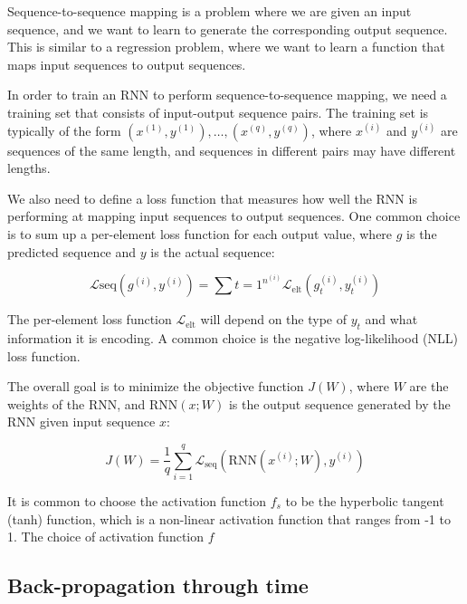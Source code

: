     Sequence-to-sequence mapping is a problem where we are given an input sequence, and we want to learn to generate the corresponding output sequence. This is similar to a regression problem, where we want to learn a function that maps input sequences to output sequences.
    
    In order to train an RNN to perform sequence-to-sequence mapping, we need a training set that consists of input-output sequence pairs. The training set is typically of the form ${(x^{(1)}, y^{(1)}), \dots, (x^{(q)}, y^{(q)})}$, where $x^{(i)}$ and $y^{(i)}$ are sequences of the same length, and sequences in different pairs may have different lengths.
    
    We also need to define a loss function that measures how well the RNN is performing at mapping input sequences to output sequences. One common choice is to sum up a per-element loss function for each output value, where $g$ is the predicted sequence and $y$ is the actual sequence:
    
    \begin{equation}
    \mathcal{L}{\text{seq}}\left(g^{(i)}, y^{(i)}\right) = \sum{t = 1}^{n^{(i)}}\mathcal{L}_\text{elt}\left(g_t^{(i)}, y_t^{(i)}\right)
    \end{equation}
    
    The per-element loss function $\mathcal{L}_\text{elt}$ will depend on the type of $y_t$ and what information it is encoding. A common choice is the negative log-likelihood (NLL) loss function.
    
    The overall goal is to minimize the objective function $J(W)$, where $W$ are the weights of the RNN, and $\text{RNN}(x; W)$ is the output sequence generated by the RNN given input sequence $x$:
    
    \begin{equation}
    J(W) = \frac{1}{q} \sum_{i = 1}^q\mathcal{L}_{\text{seq}}\left( \text{RNN}(x^{(i)};W), y^{(i)}\right)
    \end{equation}
    
    It is common to choose the activation function $f_s$ to be the hyperbolic tangent (tanh) function, which is a non-linear activation function that ranges from -1 to 1. The choice of activation function $f$

    \subsection{Back-propagation through time}
        \label{sec:bptt}
        
